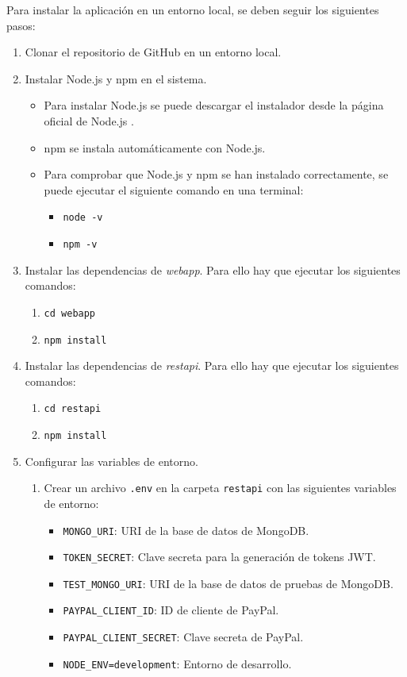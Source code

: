 Para instalar la aplicación en un entorno local, se deben seguir los siguientes pasos:
\begin{enumerate}
    \item Clonar el repositorio de GitHub en un entorno local.
    \item Instalar Node.js y npm en el sistema.
    \begin{itemize}
        \item Para instalar Node.js se puede descargar el instalador desde la página oficial de Node.js .
        \item npm se instala automáticamente con Node.js.
        \item Para comprobar que Node.js y npm se han instalado correctamente, se puede ejecutar el siguiente comando en una terminal:
        \begin{itemize}
            \item \texttt{node -v}
            \item \texttt{npm -v}
        \end{itemize}
    \end{itemize}

    \item Instalar las dependencias de \textit{webapp}. Para ello hay que ejecutar los siguientes comandos:
      \begin{enumerate}
          \item \texttt{cd webapp}
          \item \texttt{npm install}
      \end{enumerate}
    \item Instalar las dependencias de \textit{restapi}. Para ello hay que ejecutar los siguientes comandos:
      \begin{enumerate}
          \item \texttt{cd restapi}
          \item \texttt{npm install}
      \end{enumerate}
    \item Configurar las variables de entorno.
      \begin{enumerate}
          \item Crear un archivo \texttt{.env} en la carpeta \texttt{restapi} con las siguientes variables de entorno:
          \begin{itemize}
              \item \texttt{MONGO\_URI}: URI de la base de datos de MongoDB.
              \item \texttt{TOKEN\_SECRET}: Clave secreta para la generación de tokens JWT.
              \item \texttt{TEST\_MONGO\_URI}: URI de la base de datos de pruebas de MongoDB.
              \item \texttt{PAYPAL\_CLIENT\_ID}: ID de cliente de PayPal.
              \item \texttt{PAYPAL\_CLIENT\_SECRET}: Clave secreta de PayPal.
              \item \texttt{NODE\_ENV=development}: Entorno de desarrollo.
          \end{itemize}


\end{enumerate}
\end{enumerate}
